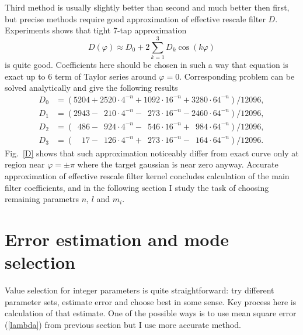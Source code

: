 \documentclass[10pt]{article}
\begin{document}
Third method is usually slightly better than second and much better then first, but precise methods
require good approximation of effective rescale filter $D$. Experiments shows that tight 7-tap
approximation
\begin{equation}
    D(\varphi) \approx D_0 + 2\sum_{k=1}^3 D_k\cos(k\varphi)
\end{equation}
is quite good. Coefficients here should be chosen in such a way that equation is exact up to 6
term of Taylor series around $\varphi = 0$. Corresponding problem can be solved analytically
and give the following results
\newcommand\0{\phantom{0}}
\begin{align}
    D_0 &= (   5204 +   2520\cdot4^{-n} +   1092\cdot16^{-n} +   3280\cdot64^{-n}) / 12096,\\
    D_1 &= (   2943 - \0 210\cdot4^{-n} - \0 273\cdot16^{-n} -   2460\cdot64^{-n}) / 12096,\\
    D_2 &= (\0  486 - \0 924\cdot4^{-n} - \0 546\cdot16^{-n} + \0 984\cdot64^{-n}) / 12096,\\
    D_3 &= (\0\0 17 - \0 126\cdot4^{-n} + \0 273\cdot16^{-n} - \0 164\cdot64^{-n}) / 12096.
\end{align}
Fig.~\ref{D} shows that such approximation noticeably differ from exact curve only at region near
$\varphi = \pm\pi$ where the target gaussian is near zero anyway. Accurate approximation of
effective rescale filter kernel concludes calculation of the main filter coefficients, and in the
following section I study the task of choosing remaining parametrs $n$, $l$ and $m_i$.


\section{Error estimation and mode selection}

Value selection for integer parameters is quite straightforward: try different parameter sets,
estimate error and choose best in some sense. Key process here is calculation of that estimate. One
of the possible ways is to use mean square error (\ref{lambda}) from previous section but I use
more accurate method.
\end{document}
